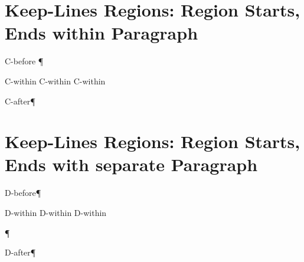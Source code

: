 \section{Keep-Lines Regions: Region Starts, Ends within Paragraph
}
C-before
¶\par
\begingroup\obeyalllines{}

C-within
C-within
C-within

\endgroup{}C-after¶\par

\section{Keep-Lines Regions: Region Starts, Ends with separate Paragraph
}
D-before¶\par
\begingroup\obeyalllines{}

D-within
D-within
D-within

\endgroup{}¶\par
D-after¶\par
